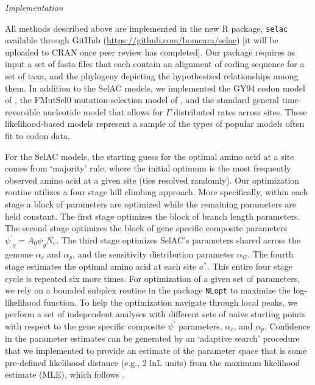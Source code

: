 \documentclass[12pt,letterpaper]{article}
\renewcommand{\subsection}[1]{%
\bigskip
\begin{center}
\begin{large}
\normalfont\itshape #1
\end{large}
\end{center}}
\newcommand{\Ne}{\ensuremath{{N_e}}\xspace} %
\newcommand{\selac}{SelAC\xspace}
\newcommand{\alphac}{\ensuremath{\alpha_c}\xspace}
\newcommand{\alphag}{\ensuremath{\alpha_G}\xspace}
\newcommand{\alphap}{\ensuremath{\alpha_p}\xspace}
\newcommand{\aopt}{\ensuremath{a^*}\xspace}
\newcommand{\psiprime}{\ensuremath{\psi^\prime}\xspace}
\begin{document}
\subsection{Implementation}\label{sec:implementation}
All methods described above are implemented in the new R package, \texttt{selac} available through GitHub (\url{https://github.com/bomeara/selac}) [it will be uploaded to CRAN once peer review has completed].
Our package requires as input a set of fasta files that each contain an alignment of coding sequence for a set of taxa, and the phylogeny depicting the hypothesized relationships among them.
In addition to the SelAC models, we implemented the GY94 codon model of \citet{GoldmanAndYang1994}, the FMutSel0 mutation-selection model of \citet{YangAndNielsen2008}, and the standard general time-reversible nucleotide model that allows for $\Gamma$ distributed rates across sites.
These likelihood-based models represent a sample of the types of popular models often fit to codon data.

For the \selac models, the starting guess for the optimal amino acid at a site comes from `majority' rule, where the initial optimum is the most frequently observed amino acid at a given site (ties resolved randomly).
Our optimization routine utilizes a four stage hill climbing approach.
More specifically, within each stage a block of parameters are optimized while the remaining parameters are held constant.
The first stage optimizes the block of branch length parameters.
The second stage optimizes the block of gene specific composite parameters $ \psiprime_g = A_0 \psi_g \Ne$.
The third stage optimizes \selac's parameters shared across the genome $\alphac$ and $\alphap$, and the sensitivity distribution parameter $\alphag$.
The fourth stage estimates the optimal amino acid at each site \aopt.
This entire four stage cycle is repeated six more times.
For optimization of a given set of parameters, we rely on a bounded subplex routine \citep{Rowan1990} in the package \texttt{NLopt} \citep{Johnson2012} to maximize the log-likelihood function.
To help the optimization navigate through local peaks, we perform a set of independent analyses with different sets of naive starting points with respect to the gene specific composite $\psiprime$ parameters, $\alphac$, and $\alphap$.
Confidence in the parameter estimates can be generated by an `adaptive search' procedure that we implemented to provide an estimate of the parameter space that is some pre-defined likelihood distance (e.g., 2 lnL units) from the maximum likelihood estimate (MLE), which follows  \citet{BeaulieuAndOMeara2016,edwards1984likelihood}.
\end{document}
